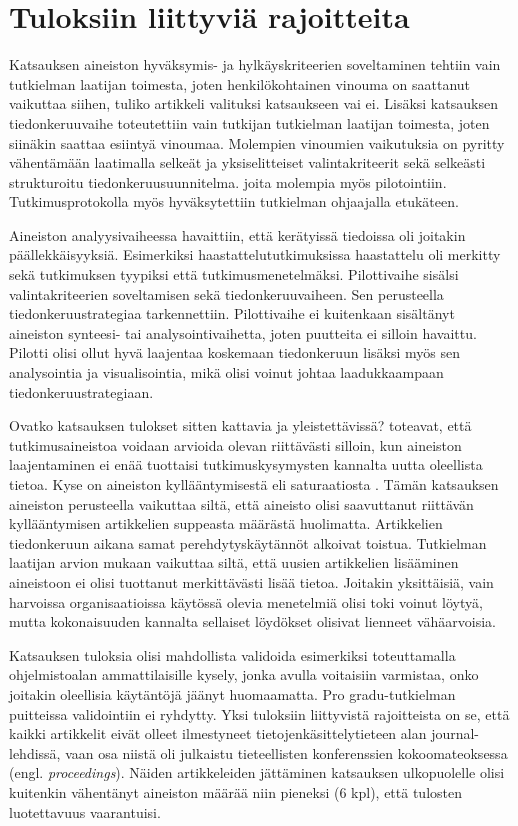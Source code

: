 \documentclass[utf8]{gradu3}
\begin{document}
\section{Tuloksiin liittyviä rajoitteita}
\label{luku-rajoitteet}

Katsauksen aineiston hyväksymis- ja hylkäyskriteerien soveltaminen tehtiin vain tutkielman laatijan toimesta, joten henkilökohtainen vinouma on saattanut vaikuttaa siihen, tuliko artikkeli valituksi katsaukseen vai ei. Lisäksi katsauksen tiedonkeruuvaihe toteutettiin vain tutkijan tutkielman laatijan toimesta, joten siinäkin saattaa esiintyä vinoumaa. Molempien vinoumien vaikutuksia on pyritty vähentämään laatimalla selkeät ja yksiselitteiset valintakriteerit sekä selkeästi strukturoitu tiedonkeruusuunnitelma. joita molempia myös pilotointiin. Tutkimusprotokolla myös hyväksytettiin tutkielman ohjaajalla etukäteen.

Aineiston analyysivaiheessa havaittiin, että kerätyissä tiedoissa oli joitakin päällekkäisyyksiä. Esimerkiksi haastattelututkimuksissa haastattelu oli merkitty sekä tutkimuksen tyypiksi että tutkimusmenetelmäksi. Pilottivaihe sisälsi valintakriteerien soveltamisen sekä tiedonkeruuvaiheen. Sen perusteella tiedonkeruustrategiaa tarkennettiin. Pilottivaihe ei kuitenkaan sisältänyt aineiston synteesi- tai analysointivaihetta, joten puutteita ei silloin havaittu. Pilotti olisi ollut hyvä laajentaa koskemaan tiedonkeruun lisäksi myös sen analysointia ja visualisointia, mikä olisi voinut johtaa laadukkaampaan tiedonkeruustrategiaan.

Ovatko katsauksen tulokset sitten kattavia ja yleistettävissä? \textcite{eskola-suoranta-1998} toteavat, että tutkimusaineistoa voidaan arvioida olevan riittävästi silloin, kun aineiston laajentaminen ei enää tuottaisi tutkimuskysymysten kannalta uutta oleellista tietoa. Kyse on aineiston kyllääntymisestä eli saturaatiosta \parencite{eskola-suoranta-1998}. Tämän katsauksen aineiston perusteella vaikuttaa siltä, että aineisto olisi saavuttanut riittävän kyllääntymisen artikkelien suppeasta määrästä huolimatta. Artikkelien tiedonkeruun aikana samat perehdytyskäytännöt alkoivat toistua. Tutkielman laatijan arvion mukaan vaikuttaa siltä, että uusien artikkelien lisääminen aineistoon ei olisi tuottanut merkittävästi lisää tietoa. Joitakin yksittäisiä, vain harvoissa organisaatioissa käytössä olevia menetelmiä olisi toki voinut löytyä, mutta kokonaisuuden kannalta sellaiset löydökset olisivat lienneet vähäarvoisia.

Katsauksen tuloksia olisi mahdollista validoida esimerkiksi toteuttamalla ohjelmistoalan ammattilaisille kysely, jonka avulla voitaisiin varmistaa, onko joitakin oleellisia käytäntöjä jäänyt huomaamatta. Pro gradu-tutkielman puitteissa validointiin ei ryhdytty. Yksi tuloksiin liittyvistä rajoitteista on se, että kaikki artikkelit eivät olleet ilmestyneet tietojenkäsittelytieteen alan journal-lehdissä, vaan osa niistä oli julkaistu tieteellisten konferenssien kokoomateoksessa (engl. \textit{proceedings}). Näiden artikkeleiden jättäminen katsauksen ulkopuolelle olisi kuitenkin vähentänyt aineiston määrää niin pieneksi (6 kpl), että tulosten luotettavuus vaarantuisi.
\end{document}
